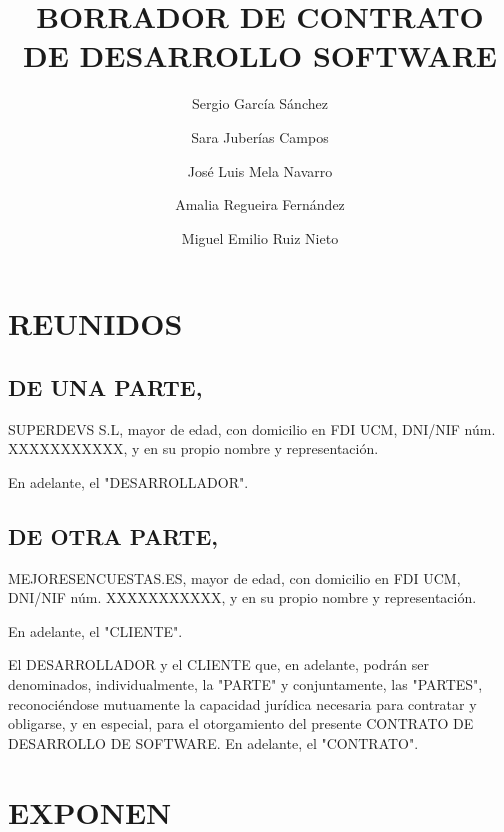\documentclass[a4paper,11pt]{report}
\begin{document}
	\title{BORRADOR DE CONTRATO DE DESARROLLO SOFTWARE}
	\author{
		Sergio García Sánchez
		\and
		Sara Juberías Campos
		\and
		José Luis Mela Navarro
		\and
		Amalia Regueira Fernández
		\and
		Miguel Emilio Ruiz Nieto
	}

	\maketitle

	\section*{REUNIDOS}

	\subsection*{DE UNA PARTE,}

	SUPERDEVS S.L, mayor de edad, con domicilio en FDI UCM, DNI/NIF núm.
	XXXXXXXXXXX, y en su propio nombre y representación.

	En adelante, el "DESARROLLADOR".

	\subsection*{DE OTRA PARTE,}

	MEJORESENCUESTAS.ES, mayor de edad, con domicilio en FDI UCM, DNI/NIF núm.
	XXXXXXXXXXX, y en su propio nombre y representación.

	En adelante, el "{CLIENTE}".

	El DESARROLLADOR y el CLIENTE que, en adelante, podrán ser denominados,
	individualmente, la "PARTE" y conjuntamente, las "PARTES",
	reconociéndose mutuamente la capacidad jurídica necesaria para contratar
	y obligarse, y en especial, para el otorgamiento del presente CONTRATO
	DE DESARROLLO DE SOFTWARE. En adelante, el "{CONTRATO}".

	\section*{EXPONEN}
\end{document}
